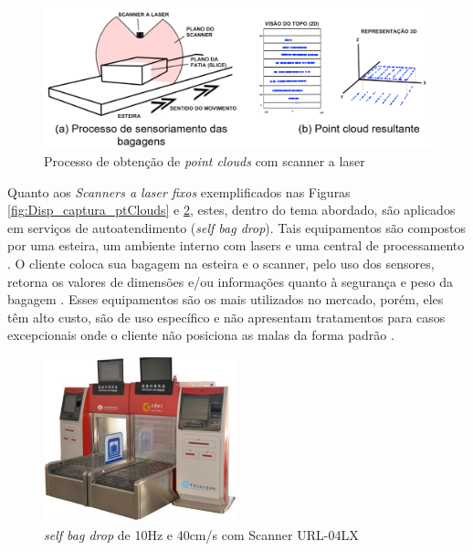         \begin{figure}[h]
           \centering
           \includegraphics[width=1\textwidth]{imagens/Processo_Obtencao_pointCloud_com_scanner_laser.png} 
           \caption{Processo de obtenção de \textit{point clouds} com scanner a laser}
           \label{fig:Process_obterPtcloud_scanner}
        \end{figure}

    Quanto aos \textit{Scanners a laser fixos} exemplificados nas Figuras \ref{fig:Disp_captura_ptClouds} e \ref{fig:sefl-bag-drop-URL_Disp}, estes, dentro do tema abordado, são aplicados em serviços de autoatendimento (\textit{self bag drop}). Tais equipamentos são compostos por uma esteira, um ambiente interno com lasers e uma central de processamento \cite{qingji_2018_method}. O cliente coloca sua bagagem na esteira e o scanner, pelo uso dos sensores, retorna os valores de dimensões e/ou informações quanto à segurança e peso da bagagem \cite{gao_2018_minimum}. Esses equipamentos são os mais utilizados no mercado, porém, eles têm alto custo, são de uso específico e não apresentam tratamentos para casos excepcionais onde o cliente não posiciona as malas da forma padrão \cite{ren_2020_a, gao_2021_airline, qingji_2018_method}.

        \begin{figure}[h]
           \centering
           \includegraphics[width=0.5\textwidth]{imagens/self_bag_drop_10hz_40cm_s_URL_04LX.png} 
           \caption{\textit{self bag drop} de 10Hz e 40cm/s com Scanner URL-04LX \cite{gao_2018_minimum}}
           \label{fig:sefl-bag-drop-URL_Disp}
        \end{figure}

